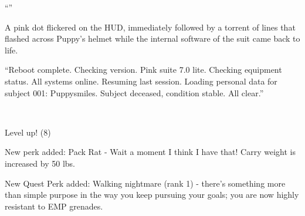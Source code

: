 ``''

A pink dot flickered on the HUD, immediately followed by a torrent of lines that flashed across Puppy's helmet while the internal software of the suit came back to life.

``{\mt Reboot complete. Checking version. Pink suite 7.0 lite. Checking equipment status. All systems online. Resuming last session. Loading personal data for subject 001: Puppysmiles. Subject deceased, condition stable. All clear.}''

\clearpage

~\vfill

\begin{engnote}
    Level up! (8)
    
    New perk added: Pack Rat - Wait a moment I think I have that! Carry weight is increased by 50 lbs.
    
    New Quest Perk added: Walking nightmare (rank 1) - there's something more than simple purpose in the way you keep pursuing your goals; you are now highly resistant to EMP grenades.
\end{engnote}


